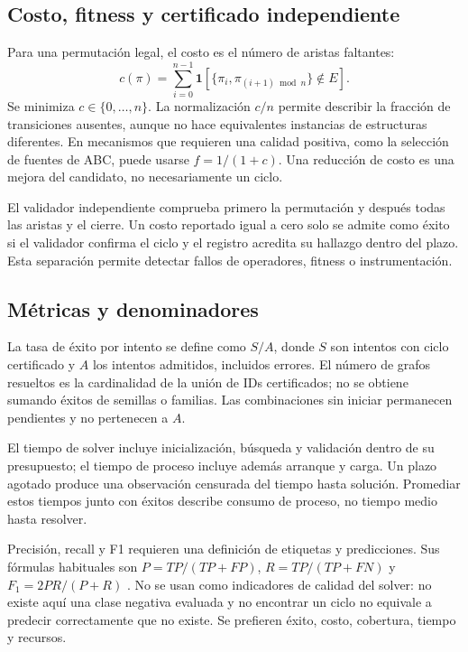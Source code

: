 \subsection{Costo, fitness y certificado independiente}
Para una permutación legal, el costo es el número de aristas faltantes:
\begin{equation}
 c(\pi)=\sum_{i=0}^{n-1}\mathbf{1}\!\left[\{\pi_i,\pi_{(i+1)\bmod n}\}\notin E\right].
\end{equation}
Se minimiza $c\in\{0,\ldots,n\}$. La normalización $c/n$ permite describir la fracción de transiciones ausentes, aunque no hace equivalentes instancias de estructuras diferentes. En mecanismos que requieren una calidad positiva, como la selección de fuentes de ABC, puede usarse $f=1/(1+c)$. Una reducción de costo es una mejora del candidato, no necesariamente un ciclo.

El validador independiente comprueba primero la permutación y después todas las aristas y el cierre. Un costo reportado igual a cero solo se admite como éxito si el validador confirma el ciclo y el registro acredita su hallazgo dentro del plazo. Esta separación permite detectar fallos de operadores, fitness o instrumentación.

\subsection{Métricas y denominadores}
La tasa de éxito por intento se define como $S/A$, donde $S$ son intentos con ciclo certificado y $A$ los intentos admitidos, incluidos errores. El número de grafos resueltos es la cardinalidad de la unión de IDs certificados; no se obtiene sumando éxitos de semillas o familias. Las combinaciones sin iniciar permanecen pendientes y no pertenecen a $A$.

El tiempo de solver incluye inicialización, búsqueda y validación dentro de su presupuesto; el tiempo de proceso incluye además arranque y carga. Un plazo agotado produce una observación censurada del tiempo hasta solución. Promediar estos tiempos junto con éxitos describe consumo de proceso, no tiempo medio hasta resolver.

Precisión, recall y F1 requieren una definición de etiquetas y predicciones. Sus fórmulas habituales son $P=TP/(TP+FP)$, $R=TP/(TP+FN)$ y $F_1=2PR/(P+R)$ \citep{sokolovaLapalme2009Classification}. No se usan como indicadores de calidad del solver: no existe aquí una clase negativa evaluada y no encontrar un ciclo no equivale a predecir correctamente que no existe. Se prefieren éxito, costo, cobertura, tiempo y recursos.
